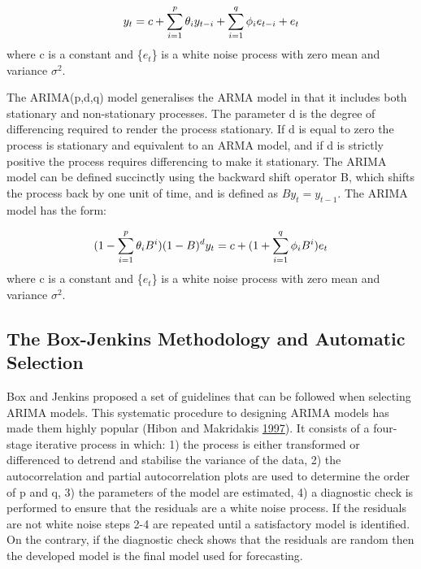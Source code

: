 \documentclass[12pt,preprint, authoryear]{elsarticle}
\numberwithin{equation}{section}
\numberwithin{figure}{section}
\numberwithin{table}{section}
\begin{document}
\[ 
    y_t = c + \sum_{i = 1}^{p} \theta_{i} y_{t-i} + \sum_{i = 1}^{q} \phi_{i} e_{t-i}+ e_t \label{eq1} \\ \notag
\] where c is a constant and \{\(e_t\)\} is a white noise process with
zero mean and variance \(\sigma^2\).

The ARIMA(p,d,q) model generalises the ARMA model in that it includes
both stationary and non-stationary processes. The parameter d is the
degree of differencing required to render the process stationary. If d
is equal to zero the process is stationary and equivalent to an ARMA
model, and if d is strictly positive the process requires differencing
to make it stationary. The ARIMA model can be defined succinctly using
the backward shift operator B, which shifts the process back by one unit
of time, and is defined as \(By_t = y_{t-1}\). The ARIMA model has the
form:

\[ 
    (1-\sum_{i = 1}^{p} \theta_{i} B^i)(1-B)^dy_t = c + (1 + \sum_{i = 1}^{q} \phi_{i} B^i)e_t \label{eq2} \\ \notag 
\] where c is a constant and \{\(e_t\)\} is a white noise process with
zero mean and variance \(\sigma^2\).

\subsection{The Box-Jenkins Methodology and Automatic
Selection}\label{the-box-jenkins-methodology-and-automatic-selection}

Box and Jenkins proposed a set of guidelines that can be followed when
selecting ARIMA models. This systematic procedure to designing ARIMA
models has made them highly popular (Hibon and Makridakis
\protect\hyperlink{ref-spyros1997}{1997}). It consists of a four-stage
iterative process in which: 1) the process is either transformed or
differenced to detrend and stabilise the variance of the data, 2) the
autocorrelation and partial autocorrelation plots are used to determine
the order of p and q, 3) the parameters of the model are estimated, 4) a
diagnostic check is performed to ensure that the residuals are a white
noise process. If the residuals are not white noise steps 2-4 are
repeated until a satisfactory model is identified. On the contrary, if
the diagnostic check shows that the residuals are random then the
developed model is the final model used for forecasting.
\end{document}
